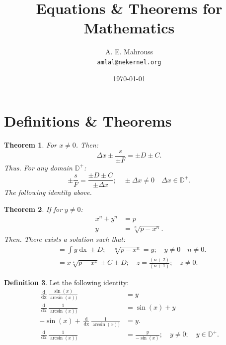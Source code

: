 \documentclass[10pt, twocolumn]{article}
\title{%
  \vspace{-1.5em}%
  \large\textbf{Equations \& Theorems for Mathematics}%
}
\author{A. E. Mahrouss\\\texttt{amlal@nekernel.org}}
\date{\today}
\theoremstyle{plain}
\newtheorem{theorem}{Theorem}[section]
\theoremstyle{definition}
\newtheorem{definition}[theorem]{Definition}
\theoremstyle{remark}
\begin{document}
\twocolumn[{%
  \maketitle
  \vspace{-0.5em}
  \vspace{0.8em}
  \rule{\linewidth}{0.4pt}
  \vspace{1em}
}]

\section{Definitions \& Theorems}

\begin{theorem}
For $x\neq 0$. Then:
\begin{equation}
  \Delta x \pm \frac{s}{\pm F} = \pm D \pm C.
\end{equation}
Thus. For any domain $\mathbb{D}^{+}$:
\begin{equation}
  \pm \frac{s}{F} = \frac{\pm D \pm C}{\pm \Delta x }; \quad \pm \Delta x \neq 0 \quad \Delta x \in \mathbb{D}^{+}.
\end{equation}
The following identity above.
\end{theorem}

\begin{theorem}
If for $y \neq 0$:
\begin{align*}
x^n + y^n &= p \\
y &= \sqrt[n]{p - x^n}.
\end{align*}
Then. There exists a solution such that:
\begin{align*}
  &= \int y \operatorname{dx} \pm D; \quad \sqrt[n]{p - x^n} = y; \quad y \neq 0\quad n \neq 0. \\
  &= x\sqrt[z]{p - x^{z}} \pm C \pm D; \quad z = \frac{(n+2)}{(n+1)}; \quad z \neq 0.
\end{align*}
\end{theorem}

\begin{definition}
	Let the following identity:
	\begin{align*}
		\frac{\operatorname{d}}{\operatorname{dx}} \frac{\sin(x)}{\arcsin(x))}&=y\\
		\frac{\operatorname{d}}{\operatorname{dx}} \frac{1}{\arcsin(x))} &= \sin(x) + y\\
		-\sin(x)+\frac{\operatorname{d}}{\operatorname{dx}}\frac{1}{\arcsin(x))}&=y.\\
		\frac{\operatorname{d}}{\operatorname{dx}}\frac{1}{\arcsin(x))}&=\frac{y}{-\sin(x)}; \quad y \neq 0; \quad y \in \mathbb{D}^{+}.
	\end{align*}
\end{definition}
\end{document}
